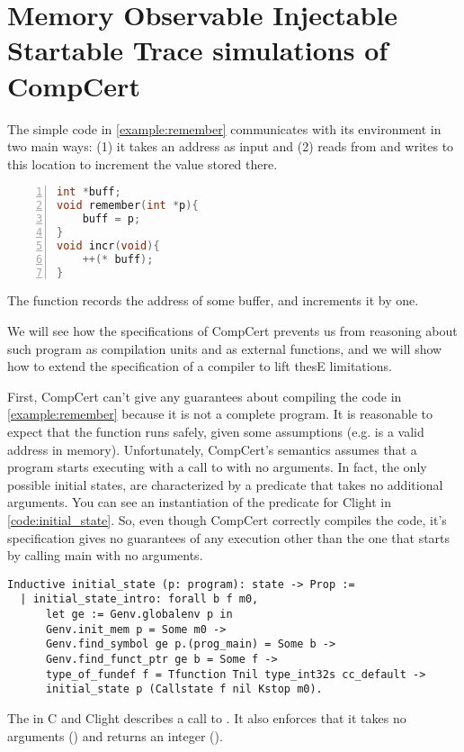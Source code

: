 \chapter{Memory Observable Injectable  Startable Trace simulations of CompCert}\label{ch:compcert}

The simple code in \ref{example:remember} communicates with its environment in two main ways: (1) it takes an address as input and (2) reads from and writes to this location to increment the value stored there.
\begin{table}\begin{lstlisting}[language=C, numbers=left]
int *buff;
void remember(int *p){
    buff = p;
}
void incr(void){
    ++(* buff);
}
\end{lstlisting}
\caption{The function  records the address of some buffer, and  increments it by one. }
\label{example:remember}
\end{table}
We will see how the specifications of CompCert prevents us from reasoning about such program as compilation units and as external functions, and we will show how to extend the specification of a compiler to lift thesE limitations.

First, CompCert can't give any guarantees about compiling the code in \ref{example:remember} because it is not a complete program. It is reasonable to expect that the function  runs safely, given some assumptions (e.g.  is a valid address in memory). Unfortunately, CompCert's semantics assumes that a program starts executing with a call to   with no arguments. In fact, the only possible initial states, are characterized by a predicate  that takes no additional arguments. You can see an instantiation of the predicate for Clight in \ref{code:initial_state}. So, even though CompCert correctly compiles the code, it's specification gives no guarantees of any execution other than the one that starts by calling main with no arguments.
\begin{table}
\begin{lstlisting}
Inductive initial_state (p: program): state -> Prop :=
  | initial_state_intro: forall b f m0,
      let ge := Genv.globalenv p in
      Genv.init_mem p = Some m0 ->
      Genv.find_symbol ge p.(prog_main) = Some b ->
      Genv.find_funct_ptr ge b = Some f ->
      type_of_fundef f = Tfunction Tnil type_int32s cc_default ->
      initial_state p (Callstate f nil Kstop m0).
\end{lstlisting}
\caption{The  in C and Clight describes a call to . It also enforces that it takes no arguments () and returns an integer ().}\label{code:initial_state}
\end{table}

